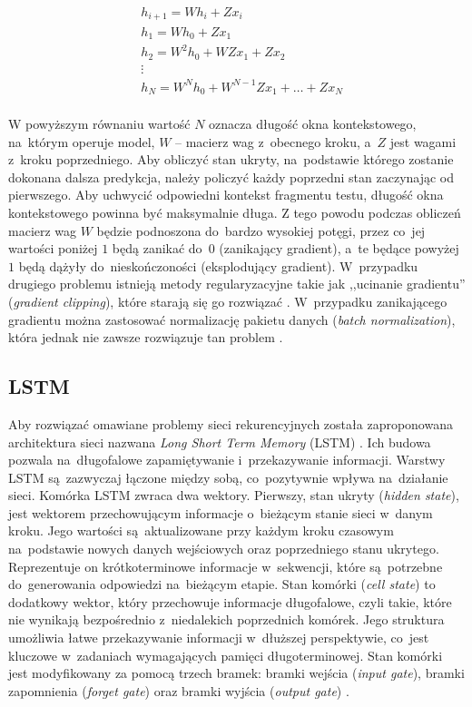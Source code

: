 \documentclass[data-science]{agh-wi} %
\begin{document}
\begin{equation}
    \begin{aligned}
         & h_{i+1}=Wh_i+Zx_i                      \\
         & h_1=Wh_0+Zx_1                          \\
         & h_2=W^2h_0+WZx_1+Zx_2                  \\
         & \vdots                                 \\
         & h_N = W^Nh_0+W^{N-1}Zx_1 +\dots + Zx_N \\
    \end{aligned}
    \label{equ:gradient}
\end{equation}

W powyższym równaniu wartość $N$ oznacza długość okna kontekstowego, na~którym operuje model, $W$ -- macierz wag z~obecnego kroku, a~$Z$ jest wagami z~kroku poprzedniego. Aby obliczyć stan ukryty, na~podstawie którego zostanie dokonana dalsza predykcja, należy policzyć każdy poprzedni stan zaczynając od pierwszego. Aby uchwycić odpowiedni kontekst fragmentu testu, długość okna kontekstowego powinna być maksymalnie długa. Z tego powodu podczas obliczeń macierz wag $W$ będzie podnoszona do~bardzo wysokiej potęgi, przez co~jej wartości poniżej $1$ będą zanikać do~$0$ (zanikający gradient), a~te będące powyżej $1$ będą dążyły do~nieskończoności (eksplodujący gradient). W~przypadku drugiego problemu istnieją metody regularyzacyjne takie jak ,,ucinanie gradientu'' (\textit{gradient clipping}), które starają się go rozwiązać \cite*{deeplearning_book}. W~przypadku zanikającego gradientu można zastosować normalizację pakietu danych (\textit{batch normalization}), która jednak nie zawsze rozwiązuje tan problem \cite*{batch_norm}.

\subsection{LSTM}
Aby rozwiązać omawiane problemy sieci rekurencyjnych została zaproponowana architektura sieci nazwana \textit{Long Short Term Memory} (LSTM) \cite{lstm_og}. Ich budowa pozwala na~długofalowe zapamiętywanie i~przekazywanie informacji. Warstwy LSTM są~zazwyczaj łączone między sobą, co~pozytywnie wpływa na~działanie sieci. Komórka LSTM zwraca dwa wektory. Pierwszy, stan ukryty (\textit{hidden state}), jest wektorem przechowującym informacje o~bieżącym stanie sieci w~danym kroku. Jego wartości są~aktualizowane przy każdym kroku czasowym na~podstawie nowych danych wejściowych oraz poprzedniego stanu ukrytego. Reprezentuje on krótkoterminowe informacje w~sekwencji, które są~potrzebne do~generowania odpowiedzi na~bieżącym etapie. Stan komórki (\textit{cell state}) to dodatkowy wektor, który przechowuje informacje długofalowe, czyli takie, które nie wynikają bezpośrednio z~niedalekich poprzednich komórek. Jego struktura umożliwia łatwe przekazywanie informacji w~dłuższej perspektywie, co~jest kluczowe w~zadaniach wymagających pamięci długoterminowej. Stan komórki jest modyfikowany za pomocą trzech bramek: bramki wejścia (\textit{input gate}), bramki zapomnienia (\textit{forget gate}) oraz bramki wyjścia (\textit{output gate}) \cite*{Understanding_lstm}.
\end{document}
